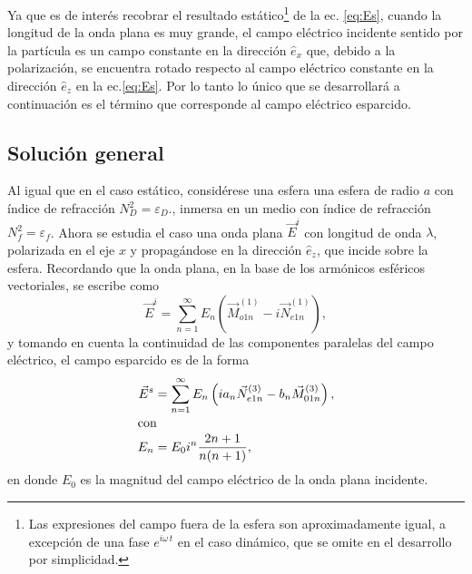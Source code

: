 \documentclass[letterpaper, 12pt] {article}
\begin{document}
Ya que es de interés recobrar el resultado estático\footnote{Las expresiones del campo fuera de la esfera son aproximadamente igual, a excepción de una fase $e^{i\omega\, t }$ en el caso dinámico, que se omite en el desarrollo por simplicidad.} de la ec. \eqref{eq:Es}, cuando la longitud de la onda plana es muy grande, el campo eléctrico incidente sentido por la partícula es un campo constante en la dirección $\hat{e}_x$ que, debido a la polarización, se encuentra rotado respecto al campo eléctrico constante en la dirección $\hat{e}_z$ en la ec.\eqref{eq:Es}. Por lo tanto lo único que se desarrollará a continuación es el término que corresponde al campo eléctrico esparcido.

\subsection{Solución general}

Al igual que en el caso estático, considérese una esfera una esfera de radio $a$ con índice de refracción $N_D ^2 = \varepsilon_D$., inmersa en un medio con índice de refracción $N_f ^2 = \varepsilon_f$. Ahora se estudia el caso una onda plana $\vec{E}^i$ con longitud de onda $\lambda$, polarizada en el eje $x$ y propagándose en la dirección $\hat{e}_z$, que incide sobre la esfera. Recordando que la onda plana, en la base de los armónicos esféricos vectoriales, se escribe como 
\begin{equation}
\vec{E}^i = \sum_{n=1}^\infty E_n \left( \vec{M}_{o1n}^{(1)} - i \vec{N}_{e1n}^{(1)}   \right),\label{eq:OndaPlana}
\end{equation}
y tomando en cuenta la continuidad de las componentes paralelas del campo eléctrico, el campo esparcido es de la forma
\begin{align}
\vec{E}^s &= \sum_{n=1}^\infty E_n \left(i a_n \vec{N}_{e1n}^{(3)} - b_n \vec{M}_{01n}^{(3)}   \right), \label{eq:Es}\\
\intertext{con}
E_n &= E_0 i^n\frac{2n+1}{n(n+1)},
\end{align}
en donde $E_0$ es la magnitud del campo eléctrico de la onda plana incidente. \\
\end{document}
